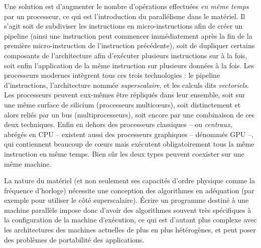 Une solution est d'augmenter le nombre d'opérations effectuées \emph{en même temps} par un processeur, ce qui est l'introduction du parallélisme dans le matériel.
Il s'agit soit de subdiviser les instructions en  micro-instructions afin de créer un pipeline (ainsi une instruction peut commencer immédiatement après la fin de la première micro-instruction de l'instruction précédente), soit de dupliquer certains composants de l'architecture afin d'exécuter plusieurs instructions sur à la fois, soit enfin l'application de la même instruction sur plusieurs données à la fois. Les processeurs modernes intègrent tous ces trois technologies : le pipeline d'instructions, l'architecture nommée \emph{superscalaire}, et les calculs dits \emph{vectoriels}.
Les processeurs peuvent eux-mêmes être répliqués dans leur ensemble, soit sur une même surface de silicium (processeurs multicœurs), soit distinctement et alors reliés par un bus (multiprocesseurs), soit encore par une combinaison de ces deux techniques.
Enfin en dehors des processeurs classiques -- ou \emph{centraux}, abrégés en CPU -- existent aussi des processeurs graphiques -- dénommés GPU --, qui contiennent beaucoup de cœurs mais exécutent obligatoirement tous la même instruction en même temps. Bien sûr les deux types peuvent coexister sur une même machine.

La nature du matériel (et non seulement ses capacités d'ordre physique comme la fréquence d'horloge) nécessite une conception des algorithmes en adéquation (par exemple pour utiliser le côté superscalaire). 
Écrire un programme destiné à une machine parallèle impose donc d'avoir des algorithmes souvent très spécifiques à la configuration de la machine d'exécution, ce qui est d'autant plus complexe avec les architectures des machines actuelles de plus en plus hétérogènes, et peut poser des problèmes de portabilité des applications.

